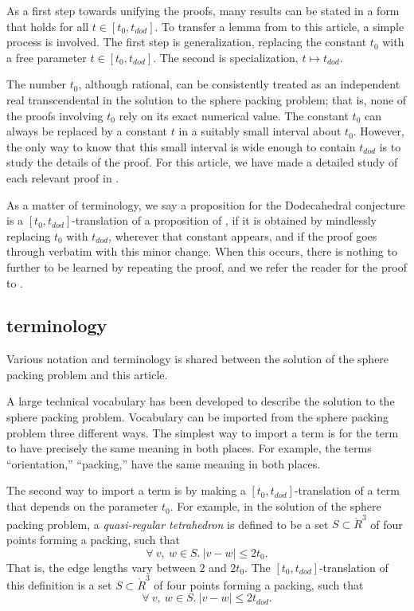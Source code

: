  As a first step towards unifying the proofs,
 many results can be stated in a form that holds for all $t\in[t_0,t_{dod}]$.
To transfer a lemma from \cite{DCG} to this article, a simple process is
involved.  The first step is generalization, replacing the constant $t_0$
with a free parameter $t\in[t_0,t_{dod}]$.  The second is specialization,
$t\mapsto t_{dod}$.  

The number $t_0$, although rational, 
can be consistently treated as an independent real transcendental 
in the solution to the sphere packing problem; that is,
none of the proofs involving $t_0$ rely on its exact numerical value.
The constant $t_0$ can always be replaced by a constant $t$
in a suitably small interval about $t_0$.  However, the only way to
know that this small interval is wide enough to contain $t_{dod}$ is to study the
details of the proof.  For this article, 
we have made a detailed study of each relevant proof in \cite{DCG}.

As a matter of terminology, we say a proposition for the Dodecahedral conjecture
is a $[t_0,t_{dod}]$-translation of a proposition of \cite{DCG},
if it is obtained by mindlessly replacing $t_0$ with $t_{dod}$, wherever that constant appears, and if the proof goes through verbatim with this minor change.
When this occurs, 
there is nothing to further to be learned by repeating the proof,
and we refer the reader  for the proof to \cite{DCG}.

\subsection{terminology}

Various notation and terminology is shared between the solution
of the sphere packing problem and this article.  

A large technical vocabulary has been developed 
to describe the solution to the sphere packing problem.  
Vocabulary can be imported from the sphere packing problem three
different ways.  The simplest way to import a term is for the
term to have precisely the same meaning in both places.  For
example, the terms ``orientation,'' ``packing,'' have the
same meaning in both places. 

The second way to import a term is by making a $[t_0,t_{dod}]$-translation of a term that depends on the parameter $t_0$.  For example,
in the solution of the sphere packing problem, a {\it quasi-regular
tetrahedron} is defined to be a set $S\subset\ring{R}^3$ of four
points forming a packing, such that
   $$
   \forall\ v,\ w \in S.\ |v - w| \le 2t_0.
   $$
That is, the edge lengths vary between $2$ and $2t_0$.
The $[t_0,t_{dod}]$-translation of this definition is a set $S\subset\ring{R}^3$
of four points forming a packing, such that
   $$
   \forall\ v,\ w \in S.\ |v - w| \le 2t_{dod}.
   $$

